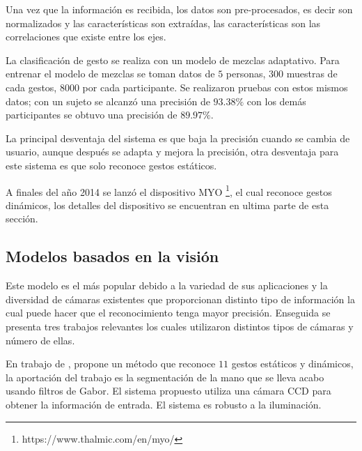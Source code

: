 Una vez que la información es recibida, los datos son pre-procesados, es decir son normalizados y las características son extraídas, las características son las correlaciones que existe entre los ejes.    
 
La clasificación de gesto se realiza con un modelo de mezclas adaptativo. Para entrenar el modelo de mezclas se toman datos de $5$ personas, $300$ muestras de cada gestos, $8000$ por cada participante. Se realizaron pruebas con estos mismos datos; con un sujeto se alcanzó una precisión de $93.38 \%$ con los demás participantes se obtuvo una precisión de $89.97 \%$.  

La principal desventaja del sistema es que baja la precisión cuando se cambia de usuario, aunque después se adapta y mejora la precisión, otra desventaja para este sistema es que solo reconoce gestos estáticos. 

A finales del año 2014 se lanzó el dispositivo MYO \footnote{https://www.thalmic.com/en/myo/}, el cual reconoce gestos dinámicos, los detalles del dispositivo se encuentran en ultima parte de esta sección. 


\subsection{Modelos basados en la visión}   

Este modelo es el más popular debido a la variedad de sus aplicaciones y la diversidad de cámaras existentes que proporcionan distinto tipo de información la cual puede hacer que el reconocimiento tenga mayor precisión. Enseguida se presenta tres  trabajos relevantes los cuales utilizaron distintos tipos de cámaras y número de ellas. 


En trabajo de \citep{Huang2011}, propone un método que reconoce $11$ gestos estáticos y dinámicos, la aportación del trabajo es la segmentación de la mano que se lleva acabo usando filtros de Gabor. El sistema propuesto utiliza una cámara CCD para obtener la información de entrada. El sistema es robusto a la iluminación. 
 
